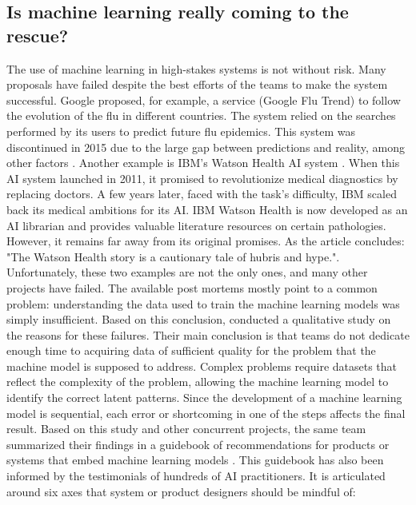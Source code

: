 \subsection{Is machine learning really coming to the rescue?}
The use of machine learning in high-stakes systems is not without risk.
Many proposals have failed despite the best efforts of the teams to make the system successful.
Google proposed, for example, a service (Google Flu Trend) to follow the evolution of the flu in different countries.
The system relied on the searches performed by its users to predict future flu epidemics.
This system was discontinued in 2015 due to the large gap between predictions and reality, among other factors \textcite{lazerWhatWeCan2015,kandulaReappraisingUtilityGoogle2019}.
Another example is IBM's Watson Health AI system \parencite{stricklandIBMWatsonHeal2019}.
When this AI system launched in 2011, it promised to revolutionize medical diagnostics by replacing doctors.
A few years later, faced with the task's difficulty, IBM scaled back its medical ambitions for its AI.
IBM Watson Health is now developed as an AI librarian and provides valuable literature resources on certain pathologies.
However, it remains far away from its original promises.
As the article concludes: "The Watson Health story is a cautionary tale of hubris and hype.".
Unfortunately, these two examples are not the only ones, and many other projects have failed.
The available post mortems mostly point to a common problem: understanding the data used to train the machine learning models was simply insufficient.
Based on this conclusion, \textcite{sambasivanEveryoneWantsModel2021} conducted a qualitative study on the reasons for these failures.
Their main conclusion is that teams do not dedicate enough time to acquiring data of sufficient quality for the problem that the machine model is supposed to address.
Complex problems require datasets that reflect the complexity of the problem, allowing the machine learning model to identify the correct latent patterns.
Since the development of a machine learning model is sequential, each error or shortcoming in one of the steps affects the final result.
Based on this study and other concurrent projects, the same team summarized their findings in a guidebook of recommendations for products or systems that embed machine learning models \parencite{pairPeopleAIGuidebook2021}.
This guidebook has also been informed by the testimonials of hundreds of AI practitioners.
It is articulated around six axes that system or product designers should be mindful of:

